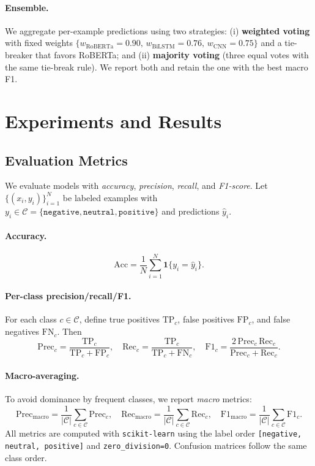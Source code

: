 \documentclass[10pt]{article}
\begin{document}
\paragraph{Ensemble.}
We aggregate per-example predictions using two strategies: (i) \textbf{weighted voting} with fixed weights $\{w_{\text{RoBERTa}}=0.90,\,w_{\text{BiLSTM}}=0.76,\,w_{\text{CNN}}=0.75\}$ and a tie-breaker that favors RoBERTa; and (ii) \textbf{majority voting} (three equal votes with the same tie-break rule). We report both and retain the one with the best macro F1.
\section{Experiments and Results}

\subsection{Evaluation Metrics}
We evaluate models with \emph{accuracy}, \emph{precision}, \emph{recall}, and \emph{F1-score}. Let $\{(x_i,y_i)\}_{i=1}^N$ be labeled examples with $y_i \in \mathcal{C}=\{\texttt{negative},\texttt{neutral},\texttt{positive}\}$ and predictions $\hat{y}_i$.

\paragraph{Accuracy.}
\[
\mathrm{Acc}=\frac{1}{N}\sum_{i=1}^{N}\mathbf{1}\{y_i=\hat{y}_i\}.
\]

\paragraph{Per-class precision/recall/F1.}
For each class $c\in\mathcal{C}$, define true positives $\mathrm{TP}_c$, false positives $\mathrm{FP}_c$, and false negatives $\mathrm{FN}_c$. Then
\[
\mathrm{Prec}_c=\frac{\mathrm{TP}_c}{\mathrm{TP}_c+\mathrm{FP}_c},\quad
\mathrm{Rec}_c=\frac{\mathrm{TP}_c}{\mathrm{TP}_c+\mathrm{FN}_c},\quad
\mathrm{F1}_c= \frac{2\,\mathrm{Prec}_c\,\mathrm{Rec}_c}{\mathrm{Prec}_c+\mathrm{Rec}_c}.
\]

\paragraph{Macro-averaging.}
To avoid dominance by frequent classes, we report \emph{macro} metrics:
\[
\mathrm{Prec}_{\mathrm{macro}}=\frac{1}{|\mathcal{C}|}\sum_{c\in\mathcal{C}} \mathrm{Prec}_c,\quad
\mathrm{Rec}_{\mathrm{macro}}=\frac{1}{|\mathcal{C}|}\sum_{c\in\mathcal{C}} \mathrm{Rec}_c,\quad
\mathrm{F1}_{\mathrm{macro}}=\frac{1}{|\mathcal{C}|}\sum_{c\in\mathcal{C}} \mathrm{F1}_c.
\]
All metrics are computed with \texttt{scikit-learn} using the label order \texttt{[negative, neutral, positive]} and \texttt{zero\_division=0}. Confusion matrices follow the same class order.
\end{document}

